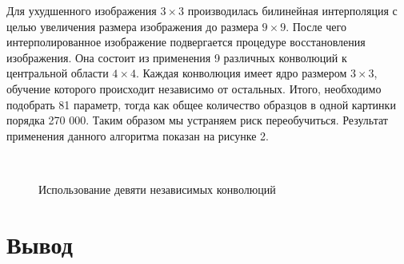 \documentclass[12pt,twoside]{article}
\begin{document}
	Для ухудшенного изображения $3 \times 3$ производилась билинейная интерполяция с целью увеличения размера изображения до размера $9 \times 9$. После чего интерполированное изображение подвергается процедуре восстановления изображения. Она состоит из применения 9 различных конволюций к центральной области $4 \times 4$. Каждая конволюция имеет ядро размером $3 \times 3$, обучение которого происходит независимо от остальных. Итого, необходимо подобрать 81 параметр, тогда как общее количество образцов в одной картинки порядка 270 000. Таким образом мы устраняем риск переобучиться. Результат применения данного алгоритма показан на рисунке 2.

\begin{figure}[h]
	\centering
	\\
	\caption{Использование девяти независимых конволюций}
	\label{fig:9conv}
\end{figure}


	
\section{Вывод}
\end{document}
